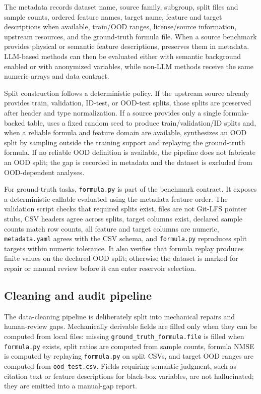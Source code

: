 The metadata records dataset name, source family, subgroup, split files and sample counts, ordered feature names, target name, feature and target descriptions when available, train/OOD ranges, license/source information, upstream resources, and the ground-truth formula file. When a source benchmark provides physical or semantic feature descriptions, \arena{} preserves them in metadata. LLM-based methods can then be evaluated either with semantic background enabled or with anonymized variables, while non-LLM methods receive the same numeric arrays and data contract.

Split construction follows a deterministic policy. If the upstream source already provides train, validation, ID-test, or OOD-test splits, those splits are preserved after header and type normalization. If a source provides only a single formula-backed table, \arena{} uses a fixed random seed to produce train/validation/ID splits and, when a reliable formula and feature domain are available, synthesizes an OOD split by sampling outside the training support and replaying the ground-truth formula. If no reliable OOD definition is available, the pipeline does not fabricate an OOD split; the gap is recorded in metadata and the dataset is excluded from OOD-dependent analyses.

For ground-truth tasks, \texttt{formula.py} is part of the benchmark contract. It exposes a deterministic callable evaluated using the metadata feature order. The validation script checks that required splits exist, files are not Git-LFS pointer stubs, CSV headers agree across splits, target columns exist, declared sample counts match row counts, all feature and target columns are numeric, \texttt{metadata.yaml} agrees with the CSV schema, and \texttt{formula.py} reproduces split targets within numeric tolerance. It also verifies that formula replay produces finite values on the declared OOD split; otherwise the dataset is marked for repair or manual review before it can enter reservoir selection.

\subsection{Cleaning and audit pipeline}

The data-cleaning pipeline is deliberately split into mechanical repairs and human-review gaps. Mechanically derivable fields are filled only when they can be computed from local files: missing \texttt{ground\_truth\_formula.file} is filled when \texttt{formula.py} exists, split ratios are computed from sample counts, formula NMSE is computed by replaying \texttt{formula.py} on split CSVs, and target OOD ranges are computed from \texttt{ood\_test.csv}. Fields requiring semantic judgment, such as citation text or feature descriptions for black-box variables, are not hallucinated; they are emitted into a manual-gap report.

